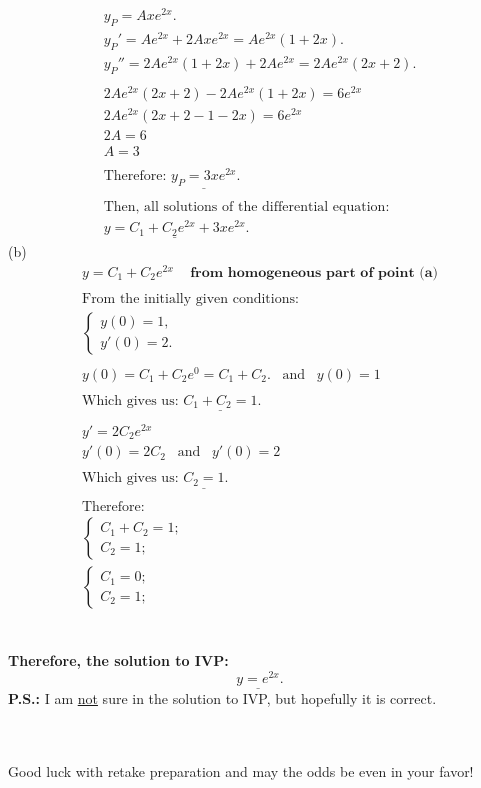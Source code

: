 \documentclass[a4paper, 12pt]{article}
\begin{document}
\begin{gather*}
y_P = Axe^{2x}.\\
y_P' = Ae^{2x} + 2Axe^{2x} = Ae^{2x} (1 + 2x).\\
y_P'' = 2Ae^{2x}(1+2x) + 2Ae^{2x} = 2Ae^{2x}(2x + 2).\\\\
2Ae^{2x}(2x + 2) - 2Ae^{2x} (1 + 2x) = 6e^{2x}\\
2Ae^{2x}(2x + 2 - 1 - 2x) = 6e^{2x}\\
2A = 6\\
A = 3\\\\
\text{Therefore: } \underline{y_P = 3xe^{2x}}.\\\\
\text{Then, all solutions of the differential equation: }\\
\underline{y = C_1 + C_2 e^{2x} + 3xe^{2x}}.
\end{gather*}
\newpage
(b) \\
\begin{gather*}
y = C_1 + C_2 e^{2x} \,\,\,\,\,\,\, \textbf{from homogeneous part of point (a)}\\\\
\text{From the initially given conditions:}\\
\begin{cases}
y(0) = 1,\\
y'(0) = 2.
\end{cases}\\\\
y(0) = C_1 + C_2 e^0 = C_1 + C_2. \,\,\,\,\, \text{and} \,\,\,\,\, y(0) = 1\\\\
\text{Which gives us: } \underline{C_1 + C_2 = 1}.\\\\
y' = 2C_2e^{2x}\\
y'(0) = 2C_2 \,\,\,\,\, \text{and} \,\,\,\,\, y'(0) = 2\\\\
\text{Which gives us: } \underline{C_2 = 1}.\\\\
\text{Therefore: }\\
\begin{cases}
C_1 + C_2 = 1;\\
C_2 = 1;
\end{cases}\\
\begin{cases}
C_1 =0;\\
C_2 = 1;
\end{cases}
\end{gather*}\\\\
\textbf{Therefore, the solution to IVP:} \[\underline{y = e^{2x}}.\] 
\bigbreak
\bigbreak
\textbf{P.S.:} I am \underline{not} sure in the solution to IVP, but hopefully it is correct.\\\\\\
\begin{framed}
Good luck with retake preparation and may the odds be even in your favor!     
\end{framed}
\end{document}
